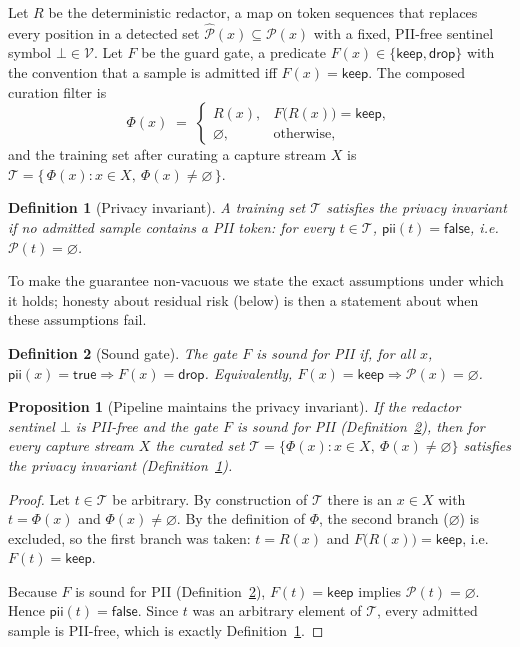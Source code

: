 \documentclass[11pt]{article}
\newtheorem{proposition}{Proposition}
\newtheorem{definition}{Definition}
\begin{document}
Let $R$ be the deterministic redactor, a map on token sequences that replaces every position in a detected set $\hat{\mathcal{P}}(x) \subseteq \mathcal{P}(x)$ with a fixed, PII-free sentinel symbol $\bot \in \mathcal{V}$. Let $F$ be the guard gate, a predicate $F(x) \in \{\textsf{keep}, \textsf{drop}\}$ with the convention that a sample is admitted iff $F(x)=\textsf{keep}$. The composed curation filter is
\[
\Phi(x) \;=\;
\begin{cases}
R(x), & F\big(R(x)\big)=\textsf{keep},\\[2pt]
\varnothing, & \text{otherwise,}
\end{cases}
\]
and the training set after curating a capture stream $X$ is $\mathcal{T} = \{\,\Phi(x) : x \in X,\ \Phi(x)\neq\varnothing\,\}$.

\begin{definition}[Privacy invariant]
\label{def:privinv}
A training set $\mathcal{T}$ \emph{satisfies the privacy invariant} if no admitted sample contains a PII token: for every $t \in \mathcal{T}$, $\textsf{pii}(t)=\textsf{false}$, i.e. $\mathcal{P}(t)=\varnothing$.
\end{definition}

To make the guarantee non-vacuous we state the exact assumptions under which it holds; honesty about residual risk (below) is then a statement about when these assumptions fail.

\begin{definition}[Sound gate]
\label{def:sound}
The gate $F$ is \emph{sound for PII} if, for all $x$, $\textsf{pii}(x)=\textsf{true} \Rightarrow F(x)=\textsf{drop}$. Equivalently, $F(x)=\textsf{keep} \Rightarrow \mathcal{P}(x)=\varnothing$.
\end{definition}

\begin{proposition}[Pipeline maintains the privacy invariant]
\label{prop:privinv}
If the redactor sentinel $\bot$ is PII-free and the gate $F$ is sound for PII (Definition~\ref{def:sound}), then for every capture stream $X$ the curated set $\mathcal{T}=\{\Phi(x):x\in X,\ \Phi(x)\neq\varnothing\}$ satisfies the privacy invariant (Definition~\ref{def:privinv}).
\end{proposition}

\begin{proof}
Let $t \in \mathcal{T}$ be arbitrary. By construction of $\mathcal{T}$ there is an $x \in X$ with $t = \Phi(x)$ and $\Phi(x) \neq \varnothing$. By the definition of $\Phi$, the second branch ($\varnothing$) is excluded, so the first branch was taken: $t = R(x)$ and $F\big(R(x)\big)=\textsf{keep}$, i.e. $F(t)=\textsf{keep}$.

Because $F$ is sound for PII (Definition~\ref{def:sound}), $F(t)=\textsf{keep}$ implies $\mathcal{P}(t)=\varnothing$. Hence $\textsf{pii}(t)=\textsf{false}$. Since $t$ was an arbitrary element of $\mathcal{T}$, every admitted sample is PII-free, which is exactly Definition~\ref{def:privinv}.
\end{proof}
\end{document}
